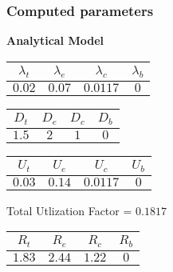 \documentclass{article}
\begin{document}
\subsubsection{Computed parameters}
\begin{minipage}{0.5\textwidth}
\centering	\textbf{Analytical Model}
\begin{table}[H]
\centering
\begin{tabular}{@{}cccc@{}}
\toprule
$\lambda_t$ & $\lambda_e$ & $\lambda_c$ & $\lambda_b$\\
\midrule
$0.02$ & $0.07$ & $0.0117$ & $0$\\
\bottomrule
\end{tabular}
\end{table}\begin{table}[H]
\centering
\begin{tabular}{@{}cccc@{}}
\toprule
$D_t$ & $D_e$ & $D_c$ & $D_b$\\
\midrule
$1.5$ & $2$ & $1$ & $0$\\
\bottomrule
\end{tabular}
\end{table}\begin{table}[H]
\centering
\begin{tabular}{@{}cccc@{}}
\toprule
$U_t$ & $U_e$ & $U_c$ & $U_b$\\
\midrule
$0.03$ & $0.14$ & $0.0117$ & $0$\\
\bottomrule
\end{tabular}
\end{table}
\centering Total Utlization Factor = $0.1817$
\begin{table}[H]
\centering
\begin{tabular}{@{}cccc@{}}
\toprule
$R_t$ & $R_e$ & $R_c$ & $R_b$\\
\midrule
$1.83$ & $2.44$ & $1.22$ & $0$\\
\bottomrule
\end{tabular}
\end{table}
\end{minipage}
\end{document}
